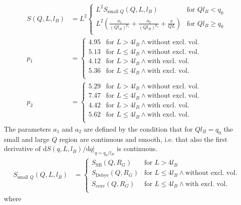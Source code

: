 \begin{align}
S(Q,L,l_B) &= L^2
\begin{cases}
L^2 S_{\textrm{small~} Q}(Q,L,l_B)& \mbox{for~}  Ql_B<q_0 \\
L^2 \left(\frac{a_1}{(Ql_B)^{p_1}}+\frac{a_2}{(Ql_B)^{p_2}}+\frac{\pi}{QL}\right)& \mbox{for~}  Ql_B\geq q_0  \\
\end{cases}
\label{eq:PprimePS3}\\
p_1 &=
\begin{cases}
4.95 & \mbox{for~} L > 4l_B \wedge \mbox{without excl. vol.} \\
5.13 & \mbox{for~} L \leq 4l_B \wedge \mbox{without excl. vol.} \\
4.12 & \mbox{for~} L > 4l_B \wedge \mbox{with excl. vol.} \\
5.36 & \mbox{for~} L \leq 4l_B \wedge \mbox{with excl. vol.} \\
\end{cases}\\
p_2 &=
\begin{cases}
5.29 & \mbox{for~} L > 4l_B \wedge \mbox{without excl. vol.} \\
7.47 & \mbox{for~} L \leq 4l_B \wedge \mbox{without excl. vol.} \\
4.42 & \mbox{for~} L > 4l_B \wedge \mbox{with excl. vol.} \\
5.62 & \mbox{for~} L \leq 4l_B \wedge \mbox{with excl. vol.} \\
\end{cases}
\end{align}
The parameters $a_1$ and $a_2$ are defined by the condition that for $Ql_B=q_0$ the small and large $Q$ region are continuous and smooth, i.e. that also the first derivative of $\mathrm{d}S(q,L,l_B)/\mathrm{d}q|_{q=q_0/l_B}$ is continuous.
\begin{align}
S_{\textrm{small~} Q}(Q,L,l_B) &=
\begin{cases}
 S_\textrm{SB}(Q,R_G)    & \mbox{for~} L >    4l_B   \\
 S_\textrm{Debye}(Q,R_G) & \mbox{for~} L \leq 4l_B  \wedge \mbox{without excl. vol.}\\
 S_\textrm{cexv}(Q,R_G)  & \mbox{for~} L \leq 4l_B  \wedge \mbox{with excl. vol.} \\
\end{cases}
\end{align}
where
